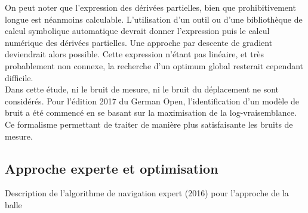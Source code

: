 On peut noter que l'expression des dérivées partielles, 
bien que prohibitivement longue est néanmoins calculable.
L'utilisation d'un outil ou d'une bibliothèque de calcul symbolique automatique devrait donner
l'expression puis le calcul numérique des dérivées partielles.
Une approche par descente de gradient deviendrait alors possible.
Cette expression n'étant pas linéaire, et très probablement non connexe, 
la recherche d'un optimum global resterait cependant difficile.\\

Dans cette étude, ni le bruit de mesure, ni le bruit du déplacement 
ne sont considérés.
Pour l'édition 2017 du German Open, l'identification d'un modèle
de bruit a été commencé en se basant sur la maximisation de la log-vraisemblance.
Ce formalisme permettant de traiter de manière plus satisfaisante 
les bruits de mesure.

\subsection{Approche experte et optimisation\label{sec:odometry_mdp}}

\begin{algorithm}[htb!]
    \begin{algorithmic}[1]
                \EndIf
                \EndIf
                \EndIf
            \EndIf
            \EndIf
        \EndWhile
    \end{algorithmic}
    \caption{\label{alg:expert_approach} Description de l'algorithme 
        de navigation expert (2016) pour l'approche de la balle}
\end{algorithm}

